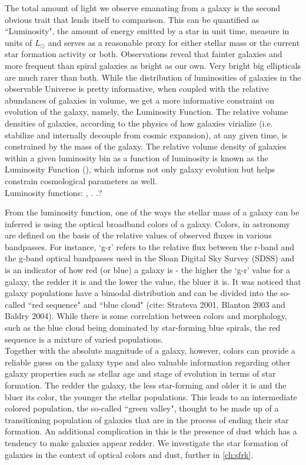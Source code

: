 The total amount of light we observe emanating from a galaxy is the second obvious trait that lends itself to comparison. This can be quantified as ``Luminosity", the amount of energy emitted by a star in unit time, measure in units of $L_{\odot}$ and serves as a reasonable proxy for either stellar mass or the current star formation activity or both. Observations reveal that fainter galaxies and more frequent than spiral galaxies as bright as our own. Very bright big ellipticals are much rarer than both. While the distribution of luminosities of galaxies in the observable Universe is pretty informative, when coupled with the relative abundances of galaxies in volume, we get a more informative constraint on evolution of the galaxy, namely, the Luminosity Function. The relative volume densities of galaxies, according to the physics of how galaxies virialize (i.e. stabilize and internally decouple from cosmic expansion), at any given time, is constrained by the mass of the galaxy. The relative volume density of galaxies within a given luminosity bin as a function of luminosity is known as the Luminosity Function (\citet{1988MNRAS.232..431E, 2003ApJ...599...38B}), which informs not only galaxy evolution but helps constrain cosmological parameters as well. \\
Luminosity functions: \citep{2012MNRAS.421..621B}, \citep{2012MNRAS.420.1239L}  . .?

From the luminosity function, one of the ways the stellar mass of a galaxy can be inferred is using the optical broadband colors of a galaxy. Colors, in astronomy are defined on the basis of the relative values of observed fluxes in various bandpasses. For instance, `g-r' refers to the relative flux between the r-band and the g-band optical bandpasses used in the Sloan Digital Sky Survey (SDSS) and is an indicator of how red (or blue) a galaxy is - the higher the `g-r' value for a galaxy, the redder it is and the lower the value, the bluer it is. It was noticed that galaxy populations have a bimodal distribution and can be divided into the so-called ``red sequence" and ``blue cloud" (cite: Strateva 2001, Blanton 2003 and Baldry 2004).  While there is some correlation between colors and morphology, such as the blue cloud being dominated by star-forming blue spirals, the red sequence is a mixture of varied populations.\\

Together with the absolute magnitude of a galaxy, however, colors can provide a reliable guess on the galaxy type and also valuable information regarding other galaxy properties such as stellar age and stage of evolution in terms of star formation. The redder the galaxy, the less star-forming and older it is and the bluer its color, the younger the stellar populations. This leads to an intermediate colored population, the so-called ``green valley", thought to be made up of a transitioning population of galaxies that are in the process of ending their star formation. An additional complication in this is the presence of dust which has a tendency to make galaxies appear redder. We investigate the star formation of galaxies in the context of optical colors and dust, further in \ref{ch:sfrk}.\\

